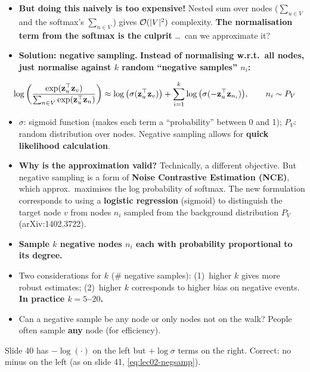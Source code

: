 \begin{itemize}
  \item \textbf{But doing this naively is too expensive!} Nested sum over nodes
    ($\sum_{u\in V}$ and the softmax's $\sum_{n\in V}$) gives
    $\mathcal{O}(|V|^2)$ complexity. \textbf{The normalisation term from the softmax
    is the culprit} \ldots\ can we approximate it?
  \item \textbf{Solution: negative sampling.} \textbf{Instead of normalising
    w.r.t.\ all nodes, just normalise against $k$ random ``negative samples''
    $n_i$:}
\end{itemize}
\begin{equation}\label{eq:lec02-negsamp}
  \log\left(\frac{\exp(\mathbf{z}_u^{\top}\mathbf{z}_v)}{\sum_{n\in V}\exp(\mathbf{z}_u^{\top}\mathbf{z}_n)}\right)
  \approx
  \log\big(\sigma(\mathbf{z}_u^{\top}\mathbf{z}_v)\big)
  +\sum_{i=1}^{k}\log\big(\sigma(-\mathbf{z}_u^{\top}\mathbf{z}_{n_i})\big),
  \qquad n_i\sim P_V
\end{equation}
\begin{itemize}
  \item $\sigma$: sigmoid function (makes each term a ``probability'' between 0
    and 1); $P_V$: random distribution over nodes. Negative sampling allows for
    \textbf{quick likelihood calculation}.
  \item \textbf{Why is the approximation valid?} Technically, a different
    objective. But negative sampling is a form of \textbf{Noise Contrastive
    Estimation (NCE)}, which approx.\ maximises the log probability of softmax.
    The new formulation corresponds to using a \textbf{logistic regression}
    (sigmoid) to distinguish the target node $v$ from nodes $n_i$ sampled from
    the background distribution $P_V$ (arXiv:1402.3722).
  \item \textbf{Sample $k$ negative nodes $n_i$ each with probability
    proportional to its degree.}
  \item Two considerations for $k$ (\# negative samples): (1)~higher $k$ gives
    more robust estimates; (2)~higher $k$ corresponds to higher bias on negative
    events. \textbf{In practice $k=5$--$20$.}
  \item Can a negative sample be any node or only nodes not on the walk? People
    often sample \textbf{any} node (for efficiency).
\end{itemize}
\begin{caution}
  Slide 40 has $-\log(\cdot)$ on the left but $+\log\sigma$ terms on the right.
  Correct: no minus on the left (as on slide 41, \cref{eq:lec02-negsamp}).
\end{caution}

